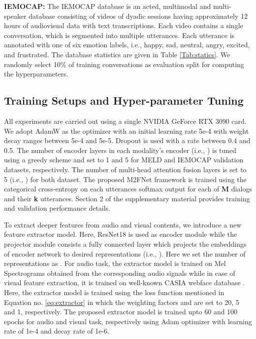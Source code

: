 \documentclass[10pt,twocolumn,letterpaper]{article}
\begin{document}
\textbf{IEMOCAP:} The IEMOCAP database \cite{Busso2008IEMOCAPIE} is an acted, multimodal and multi-speaker database consisting of videos of dyadic sessions having approximately 12 hours of audiovisual data with text transcriptions. Each video contains a single conversation, which is segmented into multiple utterances. Each utterance is annotated with one of six emotion labels, i.e., happy, sad, neutral, angry, excited, and frustrated.  The database statistics are given in Table \ref{Tab:statics}. We randomly select 10\% of training conversations as evaluation split for computing the hyperparameters.

\subsection{Training Setups and Hyper-parameter Tuning}
All experiments are carried out using a single NVIDIA GeForce RTX 3090 card. We adopt AdamW \cite{loshchilov2017decoupled} as the optimizer with an initial learning rate 5e-4 with  weight decay ranges between 5e-4 and 5e-5. 
Dropout is used with a rate between 0.4 and 0.5. The number of encoder layers in each modality's encoder (i.e., ) is tuned using a greedy scheme and set to 1 and 5 for MELD and IEMOCAP validation datasets, respectively. The number of multi-head attention fusion layers is set to 5 (i.e., ) for both dataset. The proposed M2FNet framework is trained using the categorical cross-entropy on each utterances softmax output for each of \textbf{M} dialogs and their \textbf{k} utterances. Section 2 of the supplementary material provides training and validation performance details.




To extract deeper features from audio and visual contents, we introduce a new feature extractor model. Here, ResNet18 \cite{resnet18} is used as encoder module while the projector module consists a fully connected layer which projects the embeddings of encoder network to desired representations (i.e., ). Here we set the number of representations as . For audio task, the extractor model is trained on Mel Spectrograms obtained from the corresponding audio signals while in case of visual feature extraction, it is trained on well-known CASIA webface database \cite{CASIA}. Here, the extractor model is trained using the loss function mentioned in Equation no. \ref{eq:extractor}
in which the weighting factors  and  are set to 20, 5 and 1, respectively. The proposed extractor model is trained upto 60 and 100 epochs for audio and visual task, respectively using Adam optimizer with learning rate of 1e-4 and decay rate of 1e-6. 
\end{document}
